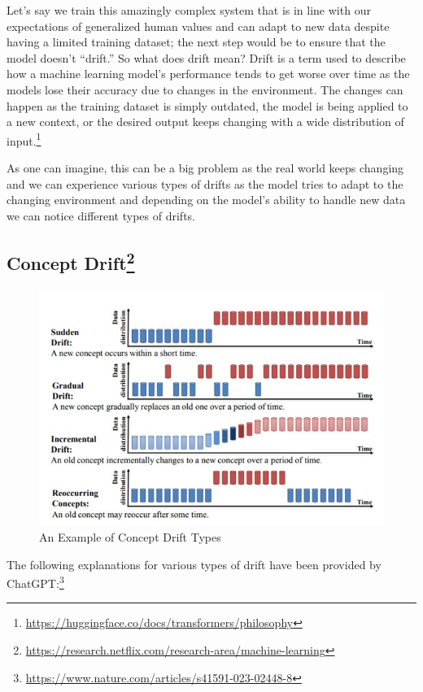 \documentclass[
]{book}
\begin{document}
Let's say we train this amazingly complex system that is in line with our expectations of generalized human values and can adapt to new data despite having a limited training dataset; the next step would be to ensure that the model doesn't ``drift.'' So what does drift mean? Drift is a term used to describe how a machine learning model's performance tends to get worse over time as the models lose their accuracy due to changes in the environment. The changes can happen as the training dataset is simply outdated, the model is being applied to a new context, or the desired output keeps changing with a wide distribution of input.\footnote{\url{https://huggingface.co/docs/transformers/philosophy}}

As one can imagine, this can be a big problem as the real world keeps changing and we can experience various types of drifts as the model tries to adapt to the changing environment and depending on the model's ability to handle new data we can notice different types of drifts.

\hypertarget{concept-drift5}{%
\subsection[Concept Drift]{\texorpdfstring{Concept Drift\footnote{\url{https://research.netflix.com/research-area/machine-learning}}}{Concept Drift}}\label{concept-drift5}}

\begin{figure}
\centering
\includegraphics{figures/figure6.png}
\caption{An Example of Concept Drift Types}
\end{figure}

The following explanations for various types of drift have been provided by ChatGPT:\footnote{\url{https://www.nature.com/articles/s41591-023-02448-8}}
\end{document}
